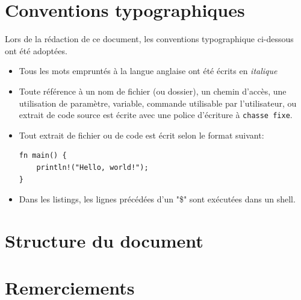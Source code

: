 \documentclass[a4paper, 12pt]{article}
\newenvironment{code}{\captionsetup{type=listing}}{}
\begin{document}
\section*{Conventions typographiques} %
Lors de la rédaction de ce document, les conventions typographique ci-dessous ont
été adoptées.
\begin{itemize}[label=\textbullet]
	\item Tous les mots empruntés à la langue anglaise ont été écrits en \textit{italique}
	\item Toute référence à un nom de fichier (ou dossier), un chemin d'accès, une 
    utilisation de paramètre, variable, commande utilisable par l'utilisateur, ou extrait de code 
    source est écrite avec une police d'écriture à \texttt{chasse fixe}.
	\item Tout extrait de fichier ou de code est écrit selon le format suivant:
    \bigbreak
    \begin{code}
        \begin{verbatim}
fn main() {
    println!("Hello, world!");
}
        \end{verbatim}
    \end{code}
    \item Dans les listings, les lignes précédées d'un "\$" sont exécutées dans un shell.
\end{itemize}

\section*{Structure du document} %

\section*{Remerciements} %

\newpage
\end{document}
